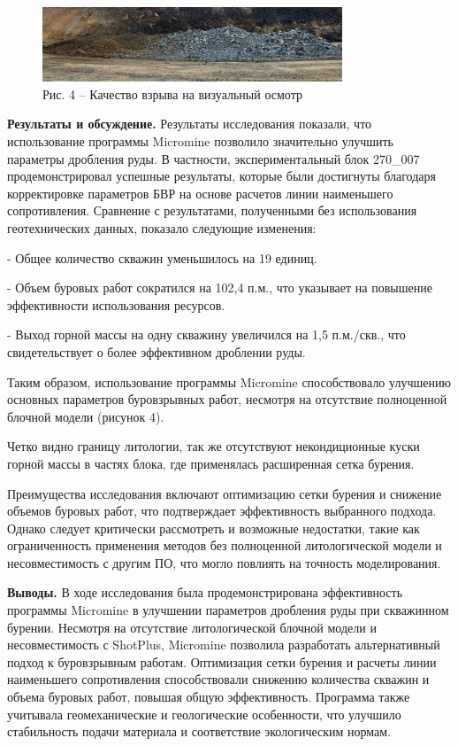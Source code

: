 \begin{figure}[H]
	\centering
	\includegraphics[width=0.8\textwidth]{media/gor/image31}
	\caption*{Рис. 4 -- Качество взрыва на визуальный осмотр}
\end{figure}
\begin{multicols}{2}


{\bfseries Результаты и обсуждение.} Результаты исследования показали, что
использование программы Micromine позволило значительно улучшить
параметры дробления руды. В частности, экспериментальный блок 270\_007
продемонстрировал успешные результаты, которые были достигнуты благодаря
корректировке параметров БВР на основе расчетов линии наименьшего
сопротивления. Сравнение с результатами, полученными без использования
геотехнических данных, показало следующие изменения:

- Общее количество скважин уменьшилось на 19 единиц.

- Объем буровых работ сократился на 102,4 п.м., что указывает на
повышение эффективности использования ресурсов.

- Выход горной массы на одну скважину увеличился на 1,5 п.м./скв., что
свидетельствует о более эффективном дроблении руды.

Таким образом, использование программы Micromine способствовало
улучшению основных параметров буровзрывных работ, несмотря на отсутствие
полноценной блочной модели (рисунок 4).


Четко видно границу литологии, так же отсутствуют некондиционные куски
горной массы в частях блока, где применялась расширенная сетка бурения.

Преимущества исследования включают оптимизацию сетки бурения и снижение
объемов буровых работ, что подтверждает эффективность выбранного
подхода. Однако следует критически рассмотреть и возможные недостатки,
такие как ограниченность применения методов без полноценной
литологической модели и несовместимость с другим ПО, что могло повлиять
на точность моделирования.

{\bfseries Выводы.} В ходе исследования была продемонстрирована
эффективность программы Micromine в улучшении параметров дробления руды
при скважинном бурении. Несмотря на отсутствие литологической блочной
модели и несовместимость с ShotPlus, Micromine позволила разработать
альтернативный подход к буровзрывным работам. Оптимизация сетки бурения
и расчеты линии наименьшего сопротивления способствовали снижению
количества скважин и объема буровых работ, повышая общую эффективность.
Программа также учитывала геомеханические и геологические особенности,
что улучшило стабильность подачи материала и соответствие экологическим
нормам.
\end{multicols}


